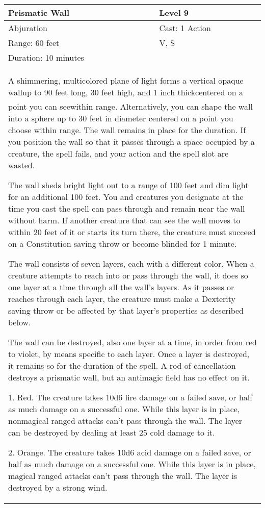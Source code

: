 \documentclass[11pt]{report}
\begin{document}
\begin{table}[H]
	\begin{tabular}{||p{6cm}|p{6cm}||}
		\hline\hline
		\bf{Prismatic Wall} & Level 9\\ \hline
		Abjuration & Cast: 1 Action\\ \hline
		Range: 60 feet & V, S\\ \hline
		Duration: 10 minutes & \\ \hline
		\multicolumn{2}{||p{12cm}||}{A shimmering, multicolored plane of light forms a vertical opaque wallup to 90 feet long, 30 feet high, and 1 inch thickcentered on a point you can seewithin range. Alternatively, you can shape the wall into a sphere up to 30 feet in diameter centered on a point you choose within range. The wall remains in place for the duration. If you position the wall so that it passes through a space occupied by a creature, the spell fails, and your action and the spell slot are wasted.

The wall sheds bright light out to a range of 100 feet and dim light for an additional 100 feet. You and creatures you designate at the time you cast the spell can pass through and remain near the wall without harm. If another creature that can see the wall moves to within 20 feet of it or starts its turn there, the creature must succeed on a Constitution saving throw or become blinded for 1 minute.

The wall consists of seven layers, each with a different color. When a creature attempts to reach into or pass through the wall, it does so one layer at a time through all the wall’s layers. As it passes or reaches through each layer, the creature must make a Dexterity saving throw or be affected by that layer’s properties as described below.

The wall can be destroyed, also one layer at a time, in order from red to violet, by means specific to each layer. Once a layer is destroyed, it remains so for the duration of the spell. A rod of cancellation destroys a prismatic wall, but an antimagic field has no effect on it.

1. Red. The creature takes 10d6 fire damage on a failed save, or half as much damage on a successful one. While this layer is in place, nonmagical ranged attacks can’t pass through the wall. The layer can be destroyed by dealing at least 25 cold damage to it.

2. Orange. The creature takes 10d6 acid damage on a failed save, or half as much damage on a successful one. While this layer is in place, magical ranged attacks can’t pass through the wall. The layer is destroyed by a strong wind.

}
\end{tabular}
\end{table}
\end{document}
